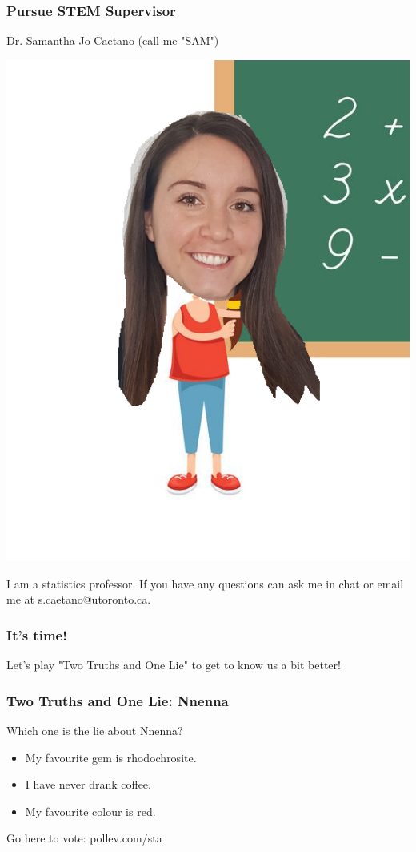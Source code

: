 \documentclass{beamer}
\begin{document}
\begin{frame}
\frametitle{\textbf{Pursue STEM} Supervisor}
Dr. Samantha-Jo Caetano (call me "SAM")
\begin{center}
	\includegraphics[width=0.3\linewidth]{Cartoon-Sam.png}
	\begin{figure}[H]
	\end{figure}
\end{center}
I am a statistics professor. If you have any questions can ask me in chat or email me at s.caetano@utoronto.ca.

\end{frame}




\begin{frame}
\frametitle{It's time!}

\begin{center}
Let's play "Two Truths and One Lie" to get to know us a bit better! 
\end{center}

\end{frame}



\begin{frame}
\frametitle{\textbf{Two Truths and One Lie:} Nnenna}

Which one is the lie about Nnenna?
\begin{itemize}
	\item My favourite gem is rhodochrosite.
	\item I have never drank coffee.
	\item My favourite colour is red.
\end{itemize}

 \vspace{0.5cm}

Go here to vote: pollev.com/sta

\end{frame}
\end{document}
